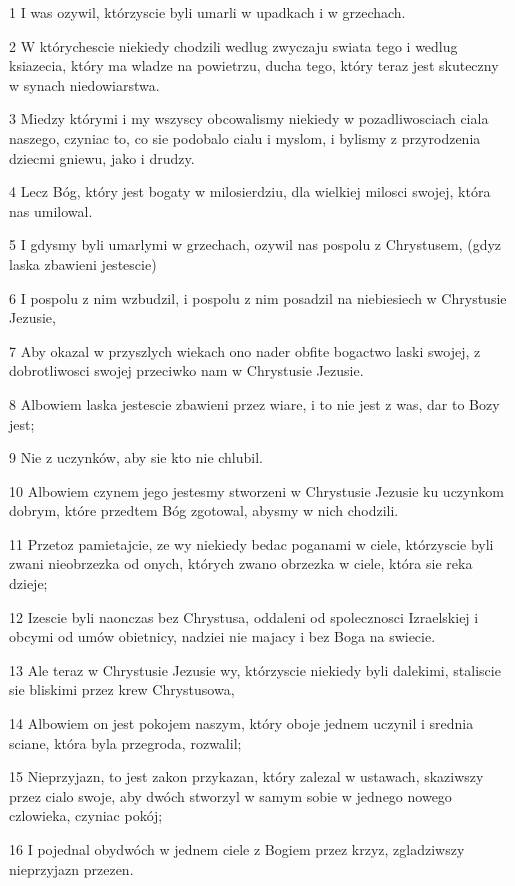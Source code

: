 \par 1 I was ozywil, którzyscie byli umarli w upadkach i w grzechach.
\par 2 W którychescie niekiedy chodzili wedlug zwyczaju swiata tego i wedlug ksiazecia, który ma wladze na powietrzu, ducha tego, który teraz jest skuteczny w synach niedowiarstwa.
\par 3 Miedzy którymi i my wszyscy obcowalismy niekiedy w pozadliwosciach ciala naszego, czyniac to, co sie podobalo cialu i myslom, i bylismy z przyrodzenia dziecmi gniewu, jako i drudzy.
\par 4 Lecz Bóg, który jest bogaty w milosierdziu, dla wielkiej milosci swojej, która nas umilowal.
\par 5 I gdysmy byli umarlymi w grzechach, ozywil nas pospolu z Chrystusem, (gdyz laska zbawieni jestescie)
\par 6 I pospolu z nim wzbudzil, i pospolu z nim posadzil na niebiesiech w Chrystusie Jezusie,
\par 7 Aby okazal w przyszlych wiekach ono nader obfite bogactwo laski swojej, z dobrotliwosci swojej przeciwko nam w Chrystusie Jezusie.
\par 8 Albowiem laska jestescie zbawieni przez wiare, i to nie jest z was, dar to Bozy jest;
\par 9 Nie z uczynków, aby sie kto nie chlubil.
\par 10 Albowiem czynem jego jestesmy stworzeni w Chrystusie Jezusie ku uczynkom dobrym, które przedtem Bóg zgotowal, abysmy w nich chodzili.
\par 11 Przetoz pamietajcie, ze wy niekiedy bedac poganami w ciele, którzyscie byli zwani nieobrzezka od onych, których zwano obrzezka w ciele, która sie reka dzieje;
\par 12 Izescie byli naonczas bez Chrystusa, oddaleni od spolecznosci Izraelskiej i obcymi od umów obietnicy, nadziei nie majacy i bez Boga na swiecie.
\par 13 Ale teraz w Chrystusie Jezusie wy, którzyscie niekiedy byli dalekimi, staliscie sie bliskimi przez krew Chrystusowa,
\par 14 Albowiem on jest pokojem naszym, który oboje jednem uczynil i srednia sciane, która byla przegroda, rozwalil;
\par 15 Nieprzyjazn, to jest zakon przykazan, który zalezal w ustawach, skaziwszy przez cialo swoje, aby dwóch stworzyl w samym sobie w jednego nowego czlowieka, czyniac pokój;
\par 16 I pojednal obydwóch w jednem ciele z Bogiem przez krzyz, zgladziwszy nieprzyjazn przezen.
